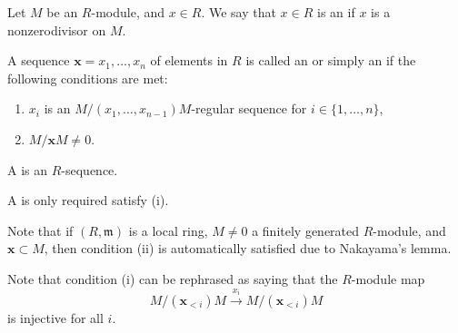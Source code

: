 \documentclass[12pt]{article}
\begin{document}
\begin{defn}
	Let $M$ be an $R$-module, and $x \in R$. We say that $x \in R$ is an  if $x$ is a nonzerodivisor on $M$.

	A sequence $\mathbf{x} = x_{1}, \ldots, x_{n}$ of elements in $R$ is called an  or simply an  if the following conditions are met:
	\begin{enumerate}[label=(\roman*)]
		\item $x_{i}$ is an $M/(x_{1}, \ldots, x_{n - 1})M$-regular sequence for $i \in \{1, \ldots, n\}$,
		\item $M/\mathbf{x}M \neq 0$.
	\end{enumerate}
	A  is an $R$-sequence.

	A  is only required satisfy (i).
\end{defn}

Note that if $(R, \mathfrak{m})$ is a local ring, $M \neq 0$ a finitely generated $R$-module, and $\mathbf{x} \subset M$, then condition (ii) is automatically satisfied due to Nakayama's lemma.

Note that condition (i) can be rephrased as saying that the $R$-module map
\begin{equation*} 
	M/(\mathbf{x}_{< i})M \xrightarrow{x_{i}} M/(\mathbf{x}_{< i})M
\end{equation*}
is injective for all $i$.
\end{document}
